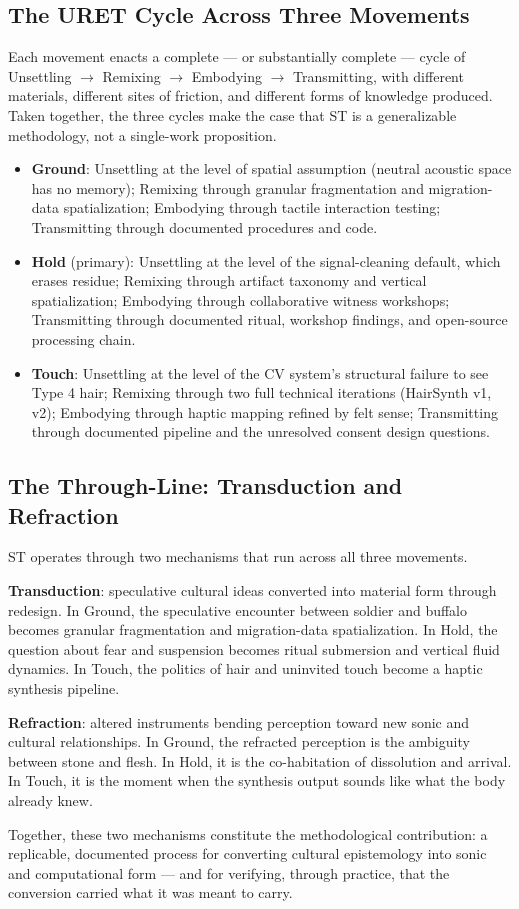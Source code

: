 \subsection*{The URET Cycle Across Three Movements}

Each movement enacts a complete — or substantially complete — cycle of Unsettling $\to$ Remixing $\to$ Embodying $\to$ Transmitting, with different materials, different sites of friction, and different forms of knowledge produced. Taken together, the three cycles make the case that ST is a generalizable methodology, not a single-work proposition.

\begin{itemize}[noitemsep]
    \item \textbf{Ground}: Unsettling at the level of spatial assumption (neutral acoustic space has no memory); Remixing through granular fragmentation and migration-data spatialization; Embodying through tactile interaction testing; Transmitting through documented procedures and code.
    \item \textbf{Hold} (primary): Unsettling at the level of the signal-cleaning default, which erases residue; Remixing through artifact taxonomy and vertical spatialization; Embodying through collaborative witness workshops; Transmitting through documented ritual, workshop findings, and open-source processing chain.
    \item \textbf{Touch}: Unsettling at the level of the CV system's structural failure to see Type 4 hair; Remixing through two full technical iterations (HairSynth v1, v2); Embodying through haptic mapping refined by felt sense; Transmitting through documented pipeline and the unresolved consent design questions.
\end{itemize}

\subsection*{The Through-Line: Transduction and Refraction}

ST operates through two mechanisms that run across all three movements.

\textbf{Transduction}: speculative cultural ideas converted into material form through redesign. In Ground, the speculative encounter between soldier and buffalo becomes granular fragmentation and migration-data spatialization. In Hold, the question about fear and suspension becomes ritual submersion and vertical fluid dynamics. In Touch, the politics of hair and uninvited touch become a haptic synthesis pipeline.

\textbf{Refraction}: altered instruments bending perception toward new sonic and cultural relationships. In Ground, the refracted perception is the ambiguity between stone and flesh. In Hold, it is the co-habitation of dissolution and arrival. In Touch, it is the moment when the synthesis output sounds like what the body already knew.

Together, these two mechanisms constitute the methodological contribution: a replicable, documented process for converting cultural epistemology into sonic and computational form — and for verifying, through practice, that the conversion carried what it was meant to carry.
